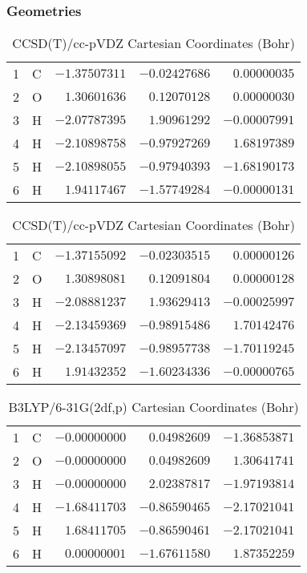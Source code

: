 \documentclass[10pt,oneside]{article}
\begin{document}
\clearpage

\subsection{}

\begin{table}[h!]
\subsubsection*{Geometries}
\begin{multicols}{2}
\centering
\caption{CCSD(T)/cc-pVTZ Cartesian Coordinates (Bohr)}
\begin{tabular}{llrrr}
\toprule
1  & C  & $-1.37507311$ & $-0.02427686$ & $ 0.00000035$ \\
2  & O  & $ 1.30601636$ & $ 0.12070128$ & $ 0.00000030$ \\
3  & H  & $-2.07787395$ & $ 1.90961292$ & $-0.00007991$ \\
4  & H  & $-2.10898758$ & $-0.97927269$ & $ 1.68197389$ \\
5  & H  & $-2.10898055$ & $-0.97940393$ & $-1.68190173$ \\
6  & H  & $ 1.94117467$ & $-1.57749284$ & $-0.00000131$ \\
\bottomrule
\end{tabular}
\caption{CCSD(T)/cc-pVDZ Cartesian Coordinates (Bohr)}
\begin{tabular}{llrrr}
\toprule
1  & C  & $-1.37155092$ & $-0.02303515$ & $ 0.00000126$ \\
2  & O  & $ 1.30898081$ & $ 0.12091804$ & $ 0.00000128$ \\
3  & H  & $-2.08881237$ & $ 1.93629413$ & $-0.00025997$ \\
4  & H  & $-2.13459369$ & $-0.98915486$ & $ 1.70142476$ \\
5  & H  & $-2.13457097$ & $-0.98957738$ & $-1.70119245$ \\
6  & H  & $ 1.91432352$ & $-1.60234336$ & $-0.00000765$ \\
\bottomrule
\end{tabular}
\end{multicols}
\end{table}

\begin{table}[h]
\centering
\caption{B3LYP/6-31G(2df,p) Cartesian Coordinates (Bohr)}
\begin{tabular}{llrrr}
\toprule
1  & C  & $-0.00000000$ & $ 0.04982609$ & $-1.36853871$ \\
2  & O  & $-0.00000000$ & $ 0.04982609$ & $ 1.30641741$ \\
3  & H  & $-0.00000000$ & $ 2.02387817$ & $-1.97193814$ \\
4  & H  & $-1.68411703$ & $-0.86590465$ & $-2.17021041$ \\
5  & H  & $ 1.68411705$ & $-0.86590461$ & $-2.17021041$ \\
6  & H  & $ 0.00000001$ & $-1.67611580$ & $ 1.87352259$ \\
\bottomrule
\end{tabular}
\end{table}
\end{document}
